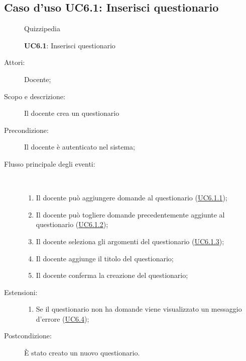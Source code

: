 \subsection{Caso d'uso UC6.1: Inserisci questionario}
	\begin{figure}[H]
		\centering
		\begin{resizedtikzpicture}{\textwidth}
		\begin{umlsystem}[x=0, fill=lightgray!20]{Quizzipedia}
		\end{umlsystem}
		\end{resizedtikzpicture}
		\caption{\textbf{UC6.1}: Inserisci questionario}
		\label{UC6.1}
	\end{figure}
\begin{description}
\item[Attori:] Docente;
\item[Scopo e descrizione:] Il docente crea un questionario
      \item[Precondizione:] Il docente è autenticato nel sistema;

        \item[Flusso principale degli eventi:] \ 
 \begin{enumerate}
          \item Il docente può aggiungere domande al questionario (\hyperlink{UC6.1.1}{UC6.1.1});
          \item Il docente può togliere domande precedentemente aggiunte al questionario (\hyperlink{UC6.1.2}{UC6.1.2});
          \item Il docente seleziona gli argomenti del questionario (\hyperlink{UC6.1.3}{UC6.1.3});
          \item Il docente aggiunge il titolo del questionario;
          \item Il docente conferma la creazione del questionario;

      \end{enumerate}
    \item[Estensioni:]
      \begin{enumerate}
          \item Se il questionario non ha domande viene visualizzato un messaggio d'errore (\hyperlink{UC6.4}{UC6.4});

      \end{enumerate}
    \item[Postcondizione:] È stato creato un nuovo questionario.
  \end{description}
\hypertarget{UC6.1.1}{}
